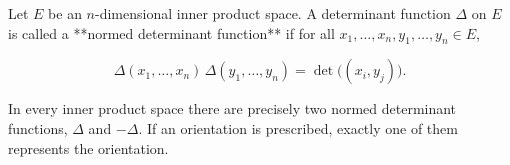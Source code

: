 Let \(E\) be an \(n\)-dimensional inner product space. A determinant function \(\Delta\) on \(E\) is called a **normed determinant function** if for all \(x_1, \ldots, x_n, y_1, \ldots, y_n \in E\),

$$\Delta(x_1, \ldots, x_n) \, \Delta(y_1, \ldots, y_n) = \det \big( (x_i, y_j) \big).$$

In every inner product space there are precisely two normed determinant functions, \(\Delta\) and \(-\Delta\). If an orientation is prescribed, exactly one of them represents the orientation.

